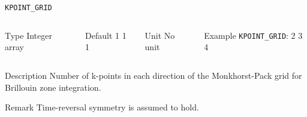 \documentclass[xcolor=dvipsnames,t]{beamer}
\begin{document}
\begin{frame}[allowframebreaks]{\texttt{KPOINT\_GRID}} \label{KPOINT_GRID}
\vspace*{-12pt}
\begin{columns}
\begin{block}{Type}
Integer array
\end{block}

\begin{block}{Default}
 1 1 1
\end{block}

\begin{block}{Unit}
No unit
\end{block}

\begin{block}{Example}
\texttt{KPOINT\_GRID}: 2 3 4
\end{block}
\end{columns}

\begin{block}{Description}
Number of k-points in each direction of the Monkhorst-Pack grid for Brillouin zone integration.
\end{block}

\begin{block}{Remark}
Time-reversal symmetry is assumed to hold. 
\end{block}

\end{frame}
\end{document}
